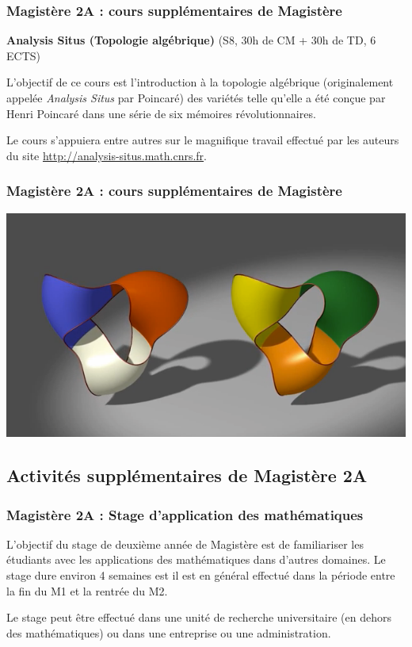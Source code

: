 \documentclass[slidetop,11pt]{beamer}
\begin{document}
\begin{frame}
\frametitle{Magistère 2A : cours supplémentaires de Magistère}

\textbf{Analysis Situs (Topologie algébrique)}
(S8, 30h de CM + 30h de TD, 6 ECTS)

\bigskip
L'objectif de ce cours est l'introduction à la topologie algébrique (originalement appelée \textit{Analysis Situs} par Poincaré) des variétés telle qu'elle a été conçue par Henri Poincaré dans une série de six mémoires révolutionnaires.

Le cours s'appuiera entre autres sur le magnifique travail effectué par les auteurs du site  \url{http://analysis-situs.math.cnrs.fr}.
\end{frame}
\begin{frame}
\frametitle{Magistère 2A : cours supplémentaires de Magistère}
\vspace*{-.45cm}  
\hspace*{-1.2cm}
\includegraphics[scale=.6]{images/moebius.png}
\end{frame}

\subsection{Activités supplémentaires de Magistère 2A}

\begin{frame}
\frametitle{Magistère 2A : Stage d’application des mathématiques}

L’objectif du stage de deuxième année de Magistère est de familiariser les étudiants avec les applications des mathématiques dans d’autres domaines. Le stage dure environ 4 semaines est il est en général effectué dans la période entre la fin du M1 et la rentrée du M2.

Le stage peut être effectué dans une unité de recherche universitaire (en dehors des mathématiques) ou dans une entreprise ou une administration.
\end{frame}
\end{document}
